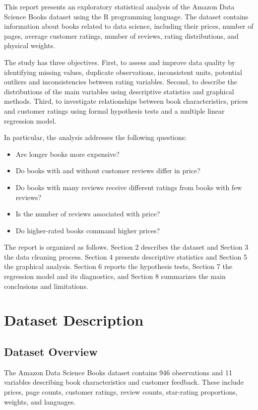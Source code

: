 \documentclass[11pt,a4paper]{article}
\begin{document}
This report presents an exploratory statistical analysis of the Amazon Data Science Books dataset using the R programming language. The dataset contains information about books related to data science, including their prices, number of pages, average customer ratings, number of reviews, rating distributions, and physical weights.

The study has three objectives. First, to assess and improve data quality by identifying missing values, duplicate observations, inconsistent units, potential outliers and inconsistencies between rating variables. Second, to describe the distributions of the main variables using descriptive statistics and graphical methods. Third, to investigate relationships between book characteristics, prices and customer ratings using formal hypothesis tests and a multiple linear regression model.

In particular, the analysis addresses the following questions:
\begin{itemize}
    \item Are longer books more expensive?
    \item Do books with and without customer reviews differ in price?
    \item Do books with many reviews receive different ratings from books with few reviews?
    \item Is the number of reviews associated with price?
    \item Do higher-rated books command higher prices?
\end{itemize}

The report is organized as follows. Section 2 describes the dataset and Section 3 the data cleaning process. Section 4 presents descriptive statistics and Section 5 the graphical analysis. Section 6 reports the hypothesis tests, Section 7 the regression model and its diagnostics, and Section 8 summarizes the main conclusions and limitations.
\newpage
\section{Dataset Description}
\begingroup
\setlength{\parskip}{3pt}
\renewcommand{\arraystretch}{0.9}
\subsection{Dataset Overview}
The Amazon Data Science Books dataset contains 946 observations
and 11 variables describing book characteristics and customer
feedback. These include prices, page counts, customer ratings,
review counts, star-rating proportions, weights, and languages.
\end{document}
